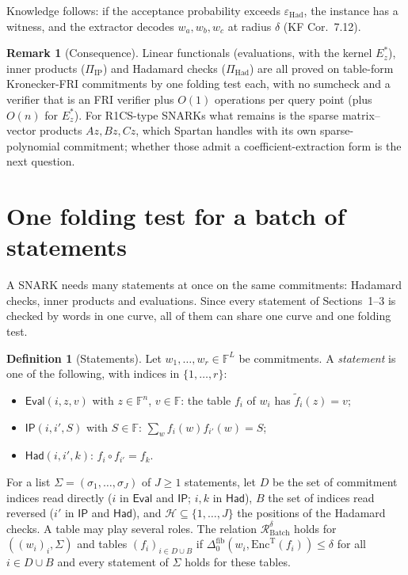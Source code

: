 \documentclass[11pt]{article}
\theoremstyle{definition}
\newtheorem{definition}[theorem]{Definition}
\newtheorem{remark}[theorem]{Remark}
\newcommand{\F}{\mathbb{F}}
\begin{document}
Knowledge follows: if the acceptance probability exceeds $\varepsilon_{\mathrm{Had}}$, the instance has a witness, and the extractor decodes $w_a,w_b,w_c$ at radius $\delta$ (KF Cor.~7.12).

\begin{remark}[Consequence]
Linear functionals (evaluations, with the kernel $E^\ast_z$), inner products ($\Pi_{\mathrm{IP}}$) and Hadamard checks ($\Pi_{\mathrm{Had}}$) are all proved on table-form Kronecker-FRI commitments by one folding test each, with no sumcheck and a verifier that is an FRI verifier plus $O(1)$ operations per query point (plus $O(n)$ for $E^\ast_z$).
For R1CS-type SNARKs what remains is the sparse matrix--vector products $Az,Bz,Cz$, which Spartan handles with its own sparse-polynomial commitment; whether those admit a coefficient-extraction form is the next question.
\end{remark}

\section{One folding test for a batch of statements}\label{sec:batch}

A SNARK needs many statements at once on the same commitments: Hadamard checks, inner products and evaluations.
Since every statement of Sections~1--3 is checked by words in one curve, all of them can share one curve and one folding test.

\begin{definition}[Statements]
Let $w_1,\dots,w_r\in\F^L$ be commitments. A \emph{statement} is one of the following, with indices in $\{1,\dots,r\}$:
\begin{itemize}[nosep]
\item $\mathsf{Eval}(i,z,v)$ with $z\in\F^n$, $v\in\F$: the table $f_i$ of $w_i$ has $\tilde f_i(z)=v$;
\item $\mathsf{IP}(i,i',S)$ with $S\in\F$: $\sum_wf_i(w)f_{i'}(w)=S$;
\item $\mathsf{Had}(i,i',k)$: $f_i\circ f_{i'}=f_k$.
\end{itemize}
For a list $\Sigma=(\sigma_1,\dots,\sigma_J)$ of $J\ge1$ statements, let $D$ be the set of commitment indices read directly ($i$ in $\mathsf{Eval}$ and $\mathsf{IP}$; $i,k$ in $\mathsf{Had}$), $B$ the set of indices read reversed ($i'$ in $\mathsf{IP}$ and $\mathsf{Had}$), and $\mathcal H\subseteq\{1,\dots,J\}$ the positions of the Hadamard checks. A table may play several roles.
The relation $\mathcal R^\delta_{\mathrm{Batch}}$ holds for $((w_i)_i,\Sigma)$ and tables $(f_i)_{i\in D\cup B}$ if $\Delta^{\mathrm{fib}}_0(w_i,\mathrm{Enc}^{\mathrm T}(f_i))\le\delta$ for all $i\in D\cup B$ and every statement of $\Sigma$ holds for these tables.
\end{definition}
\end{document}
